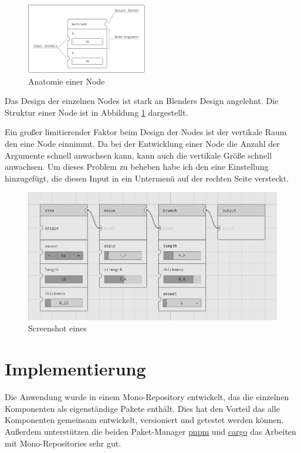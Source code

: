 \documentclass[ngerman]{article}
\begin{document}
\begingroup
\setlength\intextsep{4pt}
\begin{minipage}{\linewidth}
\begin{figure}
    \includegraphics[width=0.47\textwidth]{graphics/NODE_ANATOMY.pdf}
    \caption{Anatomie einer Node}
    \label{sec:NODE_ANATOMY}
\end{figure}

Das Design der einzelnen Nodes ist stark an Blenders Design angelehnt. Die Struktur einer Node ist in Abbildung \ref{sec:NODE_ANATOMY} dargestellt. 

Ein großer limitierender Faktor beim Design der Nodes ist der vertikale Raum den eine Node einnimmt. Da bei der Entwicklung einer Node die Anzahl der Argumente schnell anwachsen kann, kann auch die vertikale Größe schnell anwachsen. 
Um dieses Problem zu beheben habe ich den  eine Einstellung hinzugefügt, die diesen Input in ein Untermenü auf der rechten Seite versteckt. 
\end{minipage}
\br
\endgroup

\begin{figure}[htpb]
  \centering
  \includegraphics[width=1\textwidth]{graphics/node_graph.jpg}
  \caption{Screenshot eines }
  \label{fig:node_graph_screenshot}
\end{figure}


\section{Implementierung}
Die Anwendung wurde in einem Mono-Repository entwickelt, das die einzelnen Komponenten als eigenständige Pakete enthält. Dies hat den Vorteil das alle Komponenten gemeinsam entwickelt, versioniert und getestet werden können. 
\br
Außerdem unterstützen die beiden Paket-Manager \href{https://pnpm.io/}{pnpm} und \href{https://crates.io/}{cargo} das Arbeiten mit 
Mono-Repositories sehr gut. 
\end{document}
